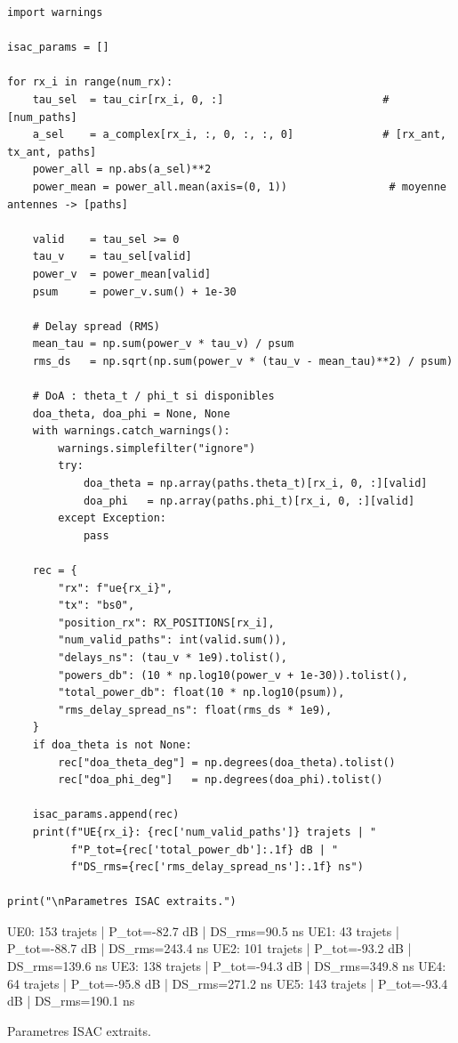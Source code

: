 \documentclass[11pt,a4paper]{article}
\begin{document}
\begin{lstlisting}
import warnings

isac_params = []

for rx_i in range(num_rx):
    tau_sel  = tau_cir[rx_i, 0, :]                         # [num_paths]
    a_sel    = a_complex[rx_i, :, 0, :, :, 0]              # [rx_ant, tx_ant, paths]
    power_all = np.abs(a_sel)**2
    power_mean = power_all.mean(axis=(0, 1))                # moyenne antennes -> [paths]

    valid    = tau_sel >= 0
    tau_v    = tau_sel[valid]
    power_v  = power_mean[valid]
    psum     = power_v.sum() + 1e-30

    # Delay spread (RMS)
    mean_tau = np.sum(power_v * tau_v) / psum
    rms_ds   = np.sqrt(np.sum(power_v * (tau_v - mean_tau)**2) / psum)

    # DoA : theta_t / phi_t si disponibles
    doa_theta, doa_phi = None, None
    with warnings.catch_warnings():
        warnings.simplefilter("ignore")
        try:
            doa_theta = np.array(paths.theta_t)[rx_i, 0, :][valid]
            doa_phi   = np.array(paths.phi_t)[rx_i, 0, :][valid]
        except Exception:
            pass

    rec = {
        "rx": f"ue{rx_i}",
        "tx": "bs0",
        "position_rx": RX_POSITIONS[rx_i],
        "num_valid_paths": int(valid.sum()),
        "delays_ns": (tau_v * 1e9).tolist(),
        "powers_db": (10 * np.log10(power_v + 1e-30)).tolist(),
        "total_power_db": float(10 * np.log10(psum)),
        "rms_delay_spread_ns": float(rms_ds * 1e9),
    }
    if doa_theta is not None:
        rec["doa_theta_deg"] = np.degrees(doa_theta).tolist()
        rec["doa_phi_deg"]   = np.degrees(doa_phi).tolist()

    isac_params.append(rec)
    print(f"UE{rx_i}: {rec['num_valid_paths']} trajets | "
          f"P_tot={rec['total_power_db']:.1f} dB | "
          f"DS_rms={rec['rms_delay_spread_ns']:.1f} ns")

print("\nParametres ISAC extraits.")
\end{lstlisting}

\begin{consoleout}
UE0: 153 trajets | P_tot=-82.7 dB | DS_rms=90.5 ns
UE1: 43 trajets | P_tot=-88.7 dB | DS_rms=243.4 ns
UE2: 101 trajets | P_tot=-93.2 dB | DS_rms=139.6 ns
UE3: 138 trajets | P_tot=-94.3 dB | DS_rms=349.8 ns
UE4: 64 trajets | P_tot=-95.8 dB | DS_rms=271.2 ns
UE5: 143 trajets | P_tot=-93.4 dB | DS_rms=190.1 ns

Parametres ISAC extraits.
\end{consoleout}
\end{document}
